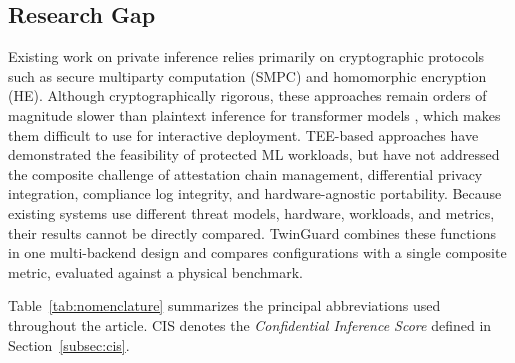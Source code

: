 \documentclass{ieeeaccess}
\begin{document}
\subsection{Research Gap}

Existing work on private inference \cite{juvekar2018gazelle,
rathee2020cryptflow2, dong2023ciphergpt, akimoto2023privformer} relies
primarily on cryptographic protocols such as secure multiparty computation
(SMPC) and homomorphic encryption (HE). Although cryptographically rigorous,
these approaches remain orders of magnitude slower than plaintext inference
for transformer models \cite{hao2022iron}, which makes them difficult to use for
interactive deployment. TEE-based approaches
\cite{mo2021ppfl, tramer2019slalom} have demonstrated the feasibility of protected ML workloads, but have not addressed the composite challenge of attestation chain management, differential privacy
integration, compliance log integrity, and hardware-agnostic portability.
Because existing systems use different threat models, hardware, workloads,
and metrics, their results cannot be directly compared. TwinGuard combines
these functions in one multi-backend design and compares configurations with a
single composite metric, evaluated against a physical benchmark.

Table~\ref{tab:nomenclature} summarizes the principal abbreviations used
throughout the article. CIS denotes the \emph{Confidential Inference Score}
defined in Section~\ref{subsec:cis}.
\end{document}
